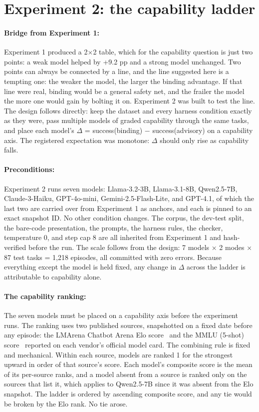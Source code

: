 \section{Experiment 2: the capability ladder}

\paragraph{Bridge from Experiment 1:} Experiment 1 produced a 2×2 table, which for the capability question is just two points: a weak model helped by +9.2 pp and a strong model unchanged. Two points can always be connected by a line, and the line suggested here is a tempting one: the weaker the model, the larger the binding advantage. If that line were real, binding would be a general safety net, and the frailer the model the more one would gain by bolting it on. Experiment 2 was built to test the line. The design follows directly: keep the dataset and every harness condition exactly as they were, pass multiple models of graded capability through the same tasks, and place each model's $\Delta$ = success(binding) $-$ success(advisory) on a capability axis. The registered expectation was monotone: $\Delta$ should only rise as capability falls.

\paragraph{Preconditions:} Experiment 2 runs seven models: Llama-3.2-3B, Llama-3.1-8B, Qwen2.5-7B, Claude-3-Haiku, GPT-4o-mini, Gemini-2.5-Flash-Lite, and GPT-4.1, of which the last two are carried over from Experiment 1 as anchors, and each is pinned to an exact snapshot ID. No other condition changes. The corpus, the dev-test split, the bare-code presentation, the prompts, the harness rules, the checker, temperature 0, and step cap 8 are all inherited from Experiment 1 and hash-verified before the run. The scale follows from the design: 7 models × 2 modes × 87 test tasks = 1,218 episodes, all committed with zero errors. Because everything except the model is held fixed, any change in $\Delta$ across the ladder is attributable to capability alone.

\paragraph{The capability ranking:} The seven models must be placed on a capability axis before the experiment runs. The ranking uses two published sources, snapshotted on a fixed date before any episode: the LMArena Chatbot Arena Elo score~\cite{chiang2024} and the MMLU (5-shot) score~\cite{hendrycks2021} reported on each vendor's official model card. The combining rule is fixed and mechanical. Within each source, models are ranked 1 for the strongest upward in order of that source's score. Each model's composite score is the mean of its per-source ranks, and a model absent from a source is ranked only on the sources that list it, which applies to Qwen2.5-7B since it was absent from the Elo snapshot. The ladder is ordered by ascending composite score, and any tie would be broken by the Elo rank. No tie arose.

